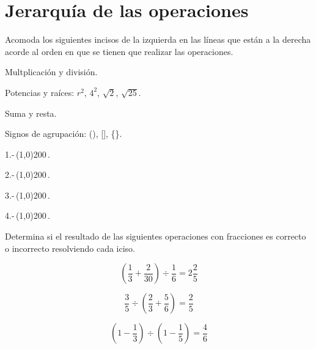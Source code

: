 \documentclass[11pt]{article}
\begin{document}
\section{Jerarqu\'ia de las operaciones}

Acomoda los siguientes incisos de la izquierda en
las l\'ineas que est\'an a la derecha acorde al orden en que se tienen que
realizar las operaciones.

\vspace{1cm}

\begin{minipage}[t]{0.5\textwidth}
Multplicaci\'on y divisi\'on.

Potencias y ra\'ices: $r^{2}$, $4^{2}$, $\sqrt{2}$, $\sqrt{25}$.

Suma y resta.

Signos de agrupaci\'on: (), [], \{\}.

\end{minipage}
\begin{minipage}[t]{0.5\textwidth}

1.-\,\line(1,0){200}\,.

\vspace{3mm}

2.-\,\line(1,0){200}\,.

\vspace{3mm}

3.-\,\line(1,0){200}\,.

\vspace{3mm}

4.-\,\line(1,0){200}\,.

\vspace{3mm}

\end{minipage}

\newpage

Determina si el resultado de las siguientes operaciones con fracciones es
correcto o incorrecto resolviendo cada iciso.

\setcounter{equation}{0}

\begin{equation}
\left( \frac{1}{3} + \frac{2}{30} \right) \div \frac{1}{6} = 2\frac{2}{5}
\end{equation}

\begin{equation}
\frac{3}{5} \div \left( \frac{2}{3} + \frac{5}{6} \right) = \frac{2}{5}
\end{equation}

\begin{equation}
\left( 1 - \frac{1}{3} \right) \div \left( 1 - \frac{1}{5} \right) = \frac{4}{6}
\end{equation}
\end{document}
